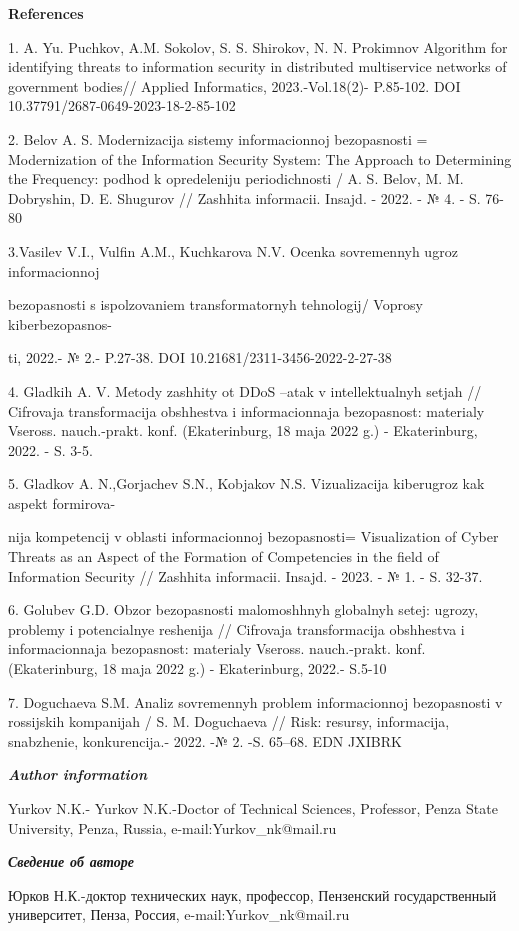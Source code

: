 \begin{center}
{\bfseries References}
\end{center}

\begin{noparindent}
1. A. Yu. Puchkov, A.M. Sokolov, S. S. Shirokov, N. N. Prokimnov
Algorithm for identifying threats to information security in distributed
multiservice networks of government bodies// Applied Informatics,
2023.-Vol.18(2)- P.85-102. DOI 10.37791/2687-0649-2023-18-2-85-102

2. Belov A. S. Modernizacija sistemy informacionnoj bezopasnosti =
Modernization of the Information Security System: The Approach to
Determining the Frequency: podhod k opredeleniju periodichnosti / A. S.
Belov, M. M. Dobryshin, D. E. Shugurov // Zashhita informacii. Insajd. -
2022. - № 4. - S. 76-80

3.Vasil\textquotesingle ev V.I., Vul\textquotesingle fin A.M.,
Kuchkarova N.V. Ocenka sovremennyh ugroz informacionnoj

bezopasnosti s ispol\textquotesingle zovaniem transformatornyh
tehnologij/ Voprosy kiberbezopasnos-

ti, 2022.- № 2.- P.27-38. DOI 10.21681/2311-3456-2022-2-27-38

4. Gladkih A. V. Metody zashhity ot DDoS --atak v
intellektual\textquotesingle nyh setjah // Cifrovaja transformacija
obshhestva i informacionnaja bezopasnost\textquotesingle: materialy
Vseross. nauch.-prakt. konf. (Ekaterinburg, 18 maja 2022 g.) -
Ekaterinburg, 2022. - S. 3-5.

5. Gladkov A. N.,Gorjachev S.N., Kobjakov N.S. Vizualizacija kiberugroz
kak aspekt formirova-

nija kompetencij v oblasti informacionnoj bezopasnosti= Visualization of
Cyber Threats as an Aspect of the Formation of Competencies in the field
of Information Security // Zashhita informacii. Insajd. - 2023. - № 1. -
S. 32-37.

6. Golubev G.D. Obzor bezopasnosti malomoshhnyh
global\textquotesingle nyh setej: ugrozy, problemy i
potencial\textquotesingle nye reshenija // Cifrovaja transformacija
obshhestva i informacionnaja bezopasnost\textquotesingle: materialy
Vseross. nauch.-prakt. konf. (Ekaterinburg, 18 maja 2022 g.) -
Ekaterinburg, 2022.- S.5-10

7. Doguchaeva S.M. Analiz sovremennyh problem informacionnoj
bezopasnosti v rossijskih kompanijah / S. M. Doguchaeva // Risk:
resursy, informacija, snabzhenie, konkurencija.- 2022. -№ 2. -S. 65--68.
EDN JXIBRK~
\end{noparindent}

\emph{{\bfseries Author information}}

\begin{noparindent}
Yurkov N.K.- Yurkov N.K.-Doctor of Technical Sciences, Professor, Penza
State University, Penza, Russia, e-mail:Yurkov\_nk@mail.ru
\end{noparindent}

\emph{{\bfseries Сведение об авторе}}

\begin{noparindent}
Юрков Н.К.-доктор технических наук, профессор, Пензенский
государственный университет, Пенза, Россия, e-mail:Yurkov\_nk@mail.ru
\end{noparindent}
